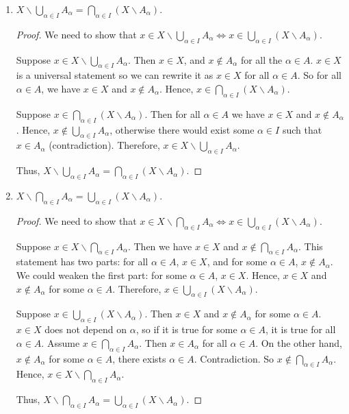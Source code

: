\documentclass[12pt, letter]{article}
\begin{document}
\begin{enumerate}
    \item $X\backslash \bigcup_{\alpha\in I}A_\alpha=\bigcap_{\alpha\in I}(X\backslash A_\alpha)$.
    \begin{proof}
        We need to show that $x\in X\backslash \bigcup_{\alpha\in I}A_\alpha \iff x\in\bigcup_{\alpha\in I}(X\backslash A_\alpha)$. 

        Suppose $x\in X\backslash \bigcup_{\alpha\in I}A_\alpha$. Then $x\in X$, and $x\notin A_\alpha$ for all the $\alpha\in A$. $x\in X$ is a universal statement so we can rewrite it as
         $x\in X$ for all $\alpha\in A$. So for all $\alpha\in A$, we have $x\in X$ and $x\notin A_\alpha$. Hence, $x\in\bigcap_{\alpha\in I}(X\backslash A_\alpha)$.
    
        Suppose $x\in\bigcap_{\alpha\in I}(X\backslash A_\alpha)$. Then for all $\alpha\in A$ we have $x\in X$ and $x\notin A_\alpha$. Hence, $x\notin \bigcup_{\alpha\in I}A_\alpha$, otherwise there would exist some $\alpha\in I$
        such that $x\in A_\alpha$ (contradiction). Therefore, $x\in X\backslash \bigcup_{\alpha\in I}A_\alpha$.

        Thus, $X\backslash \bigcup_{\alpha\in I}A_\alpha=\bigcap_{\alpha\in I}(X\backslash A_\alpha)$.
        \end{proof}
    \item $X\backslash \bigcap_{\alpha\in I}A_\alpha=\bigcup_{\alpha\in I}(X\backslash A_\alpha)$.
    \begin{proof}
        We need to show that $x\in X\backslash \bigcap_{\alpha\in I}A_\alpha\iff x\in\bigcup_{\alpha\in I}(X\backslash A_\alpha)$.

        Suppose $x\in X\backslash \bigcap_{\alpha\in I}A_\alpha$. Then we have $x\in X$ and $x\notin \bigcap_{\alpha\in I}A_\alpha$. This statement has two parts: for all $\alpha\in A$, $x\in X$, 
        and for some $\alpha\in A$, $x\notin A_\alpha$. We could weaken the first part: for some $\alpha\in A$, $x\in X$. Hence, $x\in X$ and $x\notin A_\alpha$ for some $\alpha\in A$. Therefore,
        $x\in\bigcup_{\alpha\in I}(X\backslash A_\alpha)$.

        Suppose $x\in \bigcup_{\alpha\in I}(X\backslash A_\alpha)$. Then $x\in X$ and $x\notin A_\alpha$ for some $\alpha\in A$. $x\in X$ does not depend on $\alpha$, so if it is true for 
        some $\alpha\in A$, it is true for all $\alpha\in A$. Assume $x\in \bigcap_{\alpha\in I}A_\alpha$. Then $x\in A_\alpha$ for all $\alpha\in A$. On the other hand, $x\notin A_\alpha$ for some $\alpha\in A$, 
        there exists $\alpha\in A$. Contradiction. So $x\notin \bigcap_{\alpha\in I}A_\alpha$. Hence, $x\in X\backslash \bigcap_{\alpha\in I}A_\alpha$.

        Thus, $X\backslash \bigcap_{\alpha\in I}A_\alpha=\bigcup_{\alpha\in I}(X\backslash A_\alpha)$.
    \end{proof}
\end{enumerate}
\end{document}
